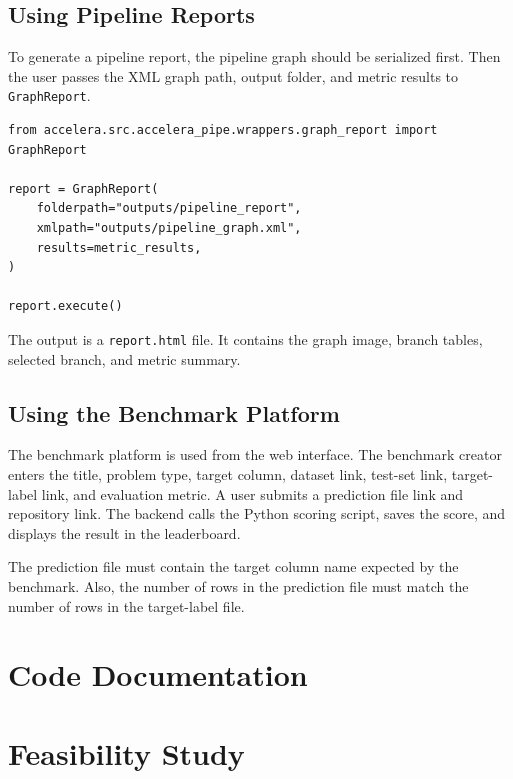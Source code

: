 \documentclass[12pt,a4paper]{report}
\begin{document}
\section{Using Pipeline Reports}
To generate a pipeline report, the pipeline graph should be serialized first.
Then the user passes the XML graph path, output folder, and metric results to
\texttt{GraphReport}.

\begin{lstlisting}[style=code,caption={Calling the pipeline graph report}]
from accelera.src.accelera_pipe.wrappers.graph_report import GraphReport

report = GraphReport(
    folderpath="outputs/pipeline_report",
    xmlpath="outputs/pipeline_graph.xml",
    results=metric_results,
)

report.execute()
\end{lstlisting}

The output is a \texttt{report.html} file. It contains the graph image, branch
tables, selected branch, and metric summary.

\section{Using the Benchmark Platform}
The benchmark platform is used from the web interface. The benchmark creator
enters the title, problem type, target column, dataset link, test-set link,
target-label link, and evaluation metric. A user submits a prediction file link
and repository link. The backend calls the Python scoring script, saves the
score, and displays the result in the leaderboard.

The prediction file must contain the target column name expected by the
benchmark. Also, the number of rows in the prediction file must match the
number of rows in the target-label file.

\chapter{Code Documentation}
\mbox{}

\chapter{Feasibility Study}
\mbox{}
\end{document}
